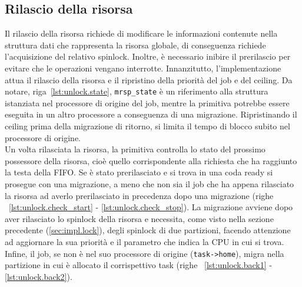 \subsection{Rilascio della risorsa}
\label{sec:impl.unlock}

Il rilascio della risorsa richiede di modificare le informazioni contenute nella struttura dati che rappresenta la risorsa globale, di conseguenza richiede l'acquisizione del relativo spinlock. Inoltre, è necessario inibire il prerilascio per evitare che le operazioni vengano interrotte. Innanzitutto, l'implementazione attua il rilascio della risorsa e il ripristino della priorità del job e del ceiling. Da notare, riga~\ref{lst:unlock.state}, \texttt{mrsp\_state} è un riferimento alla struttura istanziata nel processore di origine del job, mentre la primitiva potrebbe essere eseguita in un altro processore a conseguenza di una migrazione. Ripristinando il ceiling prima della migrazione di ritorno, si limita il tempo di blocco subito nel processore di origine.\\
Un volta rilasciata la risorsa, la primitiva controlla lo stato del prossimo possessore della risorsa, cioè quello corrispondente alla richiesta che ha raggiunto la testa della FIFO. Se è stato prerilasciato e si trova in una coda ready si prosegue con una migrazione, a meno che non sia il job che ha appena rilasciato la risorsa ad averlo prerilasciato in precedenza dopo una migrazione (righe ~\ref{lst:unlock.check_start} - \ref{lst:unlock.check_stop}). La migrazione avviene dopo aver rilasciato lo spinlock della risorsa e necessita, come visto nella sezione precedente (\ref{sec:impl.lock}), degli spinlock di due partizioni, facendo attenzione ad aggiornare la sua priorità e il parametro che indica la CPU in cui si trova.\\
Infine, il job, se non è nel suo processore di origine (\texttt{task->home}), migra nella partizione in cui è allocato il corrispettivo task (righe ~\ref{lst:unlock.back1} - \ref{lst:unlock.back2}).\\


